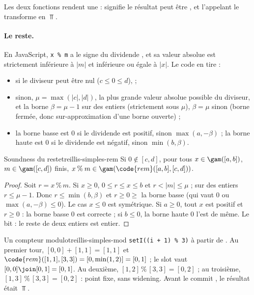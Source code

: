 Les deux fonctions rendent une  :  signifie
\og le résultat peut être \fg{}, et l'appelant le transforme en
$\Top$.

\paragraph{Le reste.} En JavaScript, \texttt{x \% m} a le signe du dividende
, et sa valeur absolue est strictement inférieure à $|m|$ et
inférieure ou égale à $|x|$. Le code en tire :
\begin{itemize}
  \item si le diviseur peut être nul ($c \le 0 \le d$),  ;
  \item sinon, $\mu = \max(|c|, |d|)$, la plus grande valeur absolue
    possible du diviseur, et la borne $\beta = \mu - 1$ sur des entiers
    (strictement sous $\mu$), $\beta = \mu$ sinon (borne fermée, donc
    sur-approximation d'une borne ouverte) ;
  \item la borne basse est $0$ si le dividende est positif, sinon
    $\max(a, -\beta)$ ; la borne haute est $0$ si le dividende est négatif,
    sinon $\min(b, \beta)$.
\end{itemize}

\begin{proposition}{Soundness du reste}{treillis-simples-rem}
  Si $0 \notin [c,d]$, pour tous $x \in \gam([a,b])$, $m \in \gam([c,d])$
  finis, $x \mathbin{\%} m \in \gam(\code{rem}([a,b],[c,d]))$.
\end{proposition}
\begin{proof}
  Soit $r = x \mathbin{\%} m$. Si $x \ge 0$, $0 \le r \le x \le b$ et
  $r < |m| \le \mu$ ; sur des entiers $r \le \mu - 1$. Donc
  $r \le \min(b, \beta)$ et $r \ge 0 \ge$ la borne basse (qui vaut $0$ ou
  $\max(a,-\beta) \le 0$). Le cas $x \le 0$ est symétrique. Si $a \ge 0$, tout
  $x$ est positif et $r \ge 0$ : la borne basse $0$ est correcte ; si
  $b \le 0$, la borne haute $0$ l'est de même. Le bit : le reste de deux
  entiers est entier.
\end{proof}

\begin{exemple}{Un compteur modulo}{treillis-simples-mod}
  \texttt{setI((i + 1) \% 3)} à partir de . Au premier tour,
  $[0,0] + [1,1] = [1,1]$ et $\code{rem}([1,1],[3,3]) = [0, \min(1, 2)] =
  [0,1]$ ; le slot vaut $[0,0] \join [0,1] = [0,1]$. Au deuxième,
  $[1,2] \mathbin{\%} [3,3] = [0,2]$ ; au troisième, $[1,3] \mathbin{\%} [3,3]
  = [0,2]$ : point fixe, sans widening. Avant le commit , le
  résultat était $\Top$.
\end{exemple}

